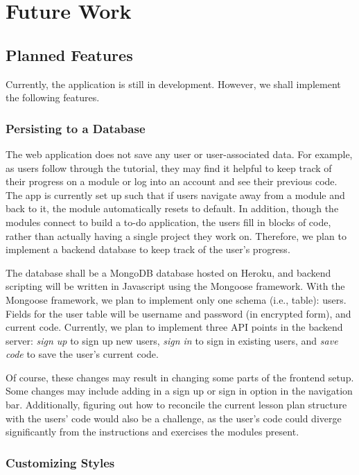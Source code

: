 \documentclass[11pt]{article}
\begin{document}
\section{Future Work}

\subsection*{Planned Features}

Currently, the application is still in development. However, we shall implement the following features.

\subsubsection*{Persisting to a Database}

The web application does not save any user or user-associated data. For example, as users follow through the tutorial, they may find it helpful to keep track of their progress on a module or log into an account and see their previous code. The app is currently set up such that if users navigate away from a module and back to it, the module automatically resets to default. In addition, though the modules connect to build a to-do application, the users fill in blocks of code, rather than actually having a single project they work on. Therefore, we plan to implement a backend database to keep track of the user's progress.

The database shall be a MongoDB database hosted on Heroku, and backend scripting will be written in Javascript using the Mongoose framework. With the Mongoose framework, we plan to implement only one schema (i.e., table): users. Fields for the user table will be username and password (in encrypted form), and current code. Currently, we plan to implement three API points in the backend server: \textit{sign up} to sign up new users, \textit{sign in} to sign in existing users, and \textit{save code} to save the user's current code.

Of course, these changes may result in changing some parts of the frontend setup. Some changes may include adding in a sign up or sign in option in the navigation bar. Additionally, figuring out how to reconcile the current lesson plan structure with the users' code would also be a challenge, as the user's code could diverge significantly from the instructions and exercises the modules present.

\subsubsection*{Customizing Styles}
\end{document}
